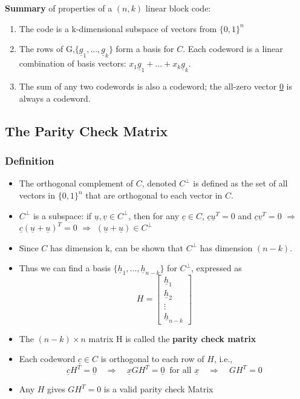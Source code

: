 \documentclass[12pt]{article}
\begin{document}
\textbf{Summary} of properties of a $(n,k)$ linear block code:
\begin{enumerate}
    \item The code is a k-dimensional subspace of vectors from $\{0,1\}^n$
    \item The rows of G,$\{\underline{g}_1,...,\underline{g}_k\}$ form a basis for $C$. Each codeword is a linear combination of basis vectors: $x_1\underline{g}_1+...+x_k\underline{g}_k$.
    \item The sum of any two codewords is also a codeword; the all-zero vector \underline{0} is always a codeword.
\end{enumerate}
\subsection{The Parity Check Matrix}
\subsubsection{Definition}
\begin{itemize}
    \item The orthogonal complement of $C$, denoted $C^\perp$ is defined as the set of all vectors in $\{0,1\}^n$ that are orthogonal to each vector in $C$.
    \item $C^\perp$ is a subspace: if $\underline{u},\underline{v} \in C^\perp$, then for any $\underline{c}\in C$, $\underline{c}\underline{u}^T=0$ and $\underline{c}\underline{v}^T=0$ $\Rightarrow$ $\underline{c}(\underline{u}+\underline{u})^T=0$ $\Rightarrow$ $(\underline{u}+\underline{u})\in C^\perp$
    \item Since $C$ has dimension k, can be shown that $C^\perp$ has dimension $(n-k)$.
    \item Thus we can find a basis $\{\underline{h}_1,...,\underline{h}_{n-k}\}$ for $C^\perp$, expressed as 
    \[
    H=\begin{bmatrix}
    \underline{h}_1 \\
    \underline{h}_2 \\
    \vdots \\
    \underline{h}_{n-k}
    \end{bmatrix}
    \]
    \item The $(n-k) \times n$ matrix H is called the \textbf{parity check matrix}
    \item Each codeword $\underline{c} \in C$ is orthogonal to each row of $H$, i.e.,
    \[
    \underline{c} H^T  = \underline{0} \quad \Longrightarrow \quad \underline{x} G H^T=\underline{0} \;\; \textrm{for all }\underline{x} \quad \Longrightarrow \quad G H^T = 0
    \]
    \item Any $H$ gives $G H^T=0$ is a valid parity check Matrix
\end{itemize}
\end{document}
